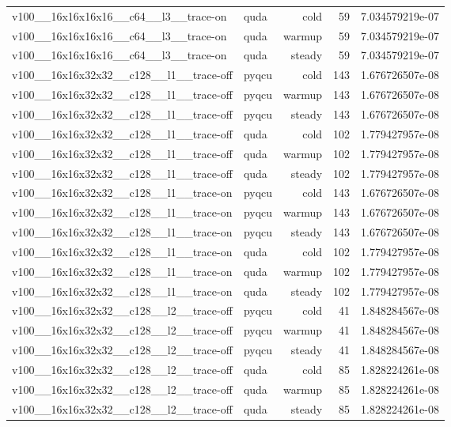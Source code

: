 \begin{table}[htbp]
\begin{tabular}{@{}llrrr@{}}
v100\_\_16x16x16x16\_\_c64\_\_l3\_\_trace-on & quda & cold & 59 & 7.034579219e-07 \\
v100\_\_16x16x16x16\_\_c64\_\_l3\_\_trace-on & quda & warmup & 59 & 7.034579219e-07 \\
v100\_\_16x16x16x16\_\_c64\_\_l3\_\_trace-on & quda & steady & 59 & 7.034579219e-07 \\
v100\_\_16x16x32x32\_\_c128\_\_l1\_\_trace-off & pyqcu & cold & 143 & 1.676726507e-08 \\
v100\_\_16x16x32x32\_\_c128\_\_l1\_\_trace-off & pyqcu & warmup & 143 & 1.676726507e-08 \\
v100\_\_16x16x32x32\_\_c128\_\_l1\_\_trace-off & pyqcu & steady & 143 & 1.676726507e-08 \\
v100\_\_16x16x32x32\_\_c128\_\_l1\_\_trace-off & quda & cold & 102 & 1.779427957e-08 \\
v100\_\_16x16x32x32\_\_c128\_\_l1\_\_trace-off & quda & warmup & 102 & 1.779427957e-08 \\
v100\_\_16x16x32x32\_\_c128\_\_l1\_\_trace-off & quda & steady & 102 & 1.779427957e-08 \\
v100\_\_16x16x32x32\_\_c128\_\_l1\_\_trace-on & pyqcu & cold & 143 & 1.676726507e-08 \\
v100\_\_16x16x32x32\_\_c128\_\_l1\_\_trace-on & pyqcu & warmup & 143 & 1.676726507e-08 \\
v100\_\_16x16x32x32\_\_c128\_\_l1\_\_trace-on & pyqcu & steady & 143 & 1.676726507e-08 \\
v100\_\_16x16x32x32\_\_c128\_\_l1\_\_trace-on & quda & cold & 102 & 1.779427957e-08 \\
v100\_\_16x16x32x32\_\_c128\_\_l1\_\_trace-on & quda & warmup & 102 & 1.779427957e-08 \\
v100\_\_16x16x32x32\_\_c128\_\_l1\_\_trace-on & quda & steady & 102 & 1.779427957e-08 \\
v100\_\_16x16x32x32\_\_c128\_\_l2\_\_trace-off & pyqcu & cold & 41 & 1.848284567e-08 \\
v100\_\_16x16x32x32\_\_c128\_\_l2\_\_trace-off & pyqcu & warmup & 41 & 1.848284567e-08 \\
v100\_\_16x16x32x32\_\_c128\_\_l2\_\_trace-off & pyqcu & steady & 41 & 1.848284567e-08 \\
v100\_\_16x16x32x32\_\_c128\_\_l2\_\_trace-off & quda & cold & 85 & 1.828224261e-08 \\
v100\_\_16x16x32x32\_\_c128\_\_l2\_\_trace-off & quda & warmup & 85 & 1.828224261e-08 \\
v100\_\_16x16x32x32\_\_c128\_\_l2\_\_trace-off & quda & steady & 85 & 1.828224261e-08 \\

\end{tabular}
\end{table}
